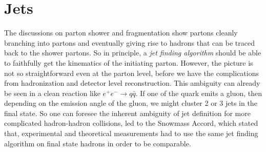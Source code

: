 
\section{Jets}
The discussions on parton shower and fragmentation show partons cleanly branching into partons and eventually giving rise to hadrons that can be traced back to the shower partons. So in principle, a \emph{jet finding algorithm} should be able to faithfully get the kinematics of the initiating parton. However, the picture is not so straightforward even at the parton level, before we have the complications from hadronization and detector level reconstruction. This ambiguity can already be seen in a clean reaction like \(e^+e^-\to q\bar{q}\). If one of the quark emits a gluon, then depending on the emission angle of the gluon, we might cluster 2 or 3 jets in the final state. So one can foresee the inherent ambiguity of jet definition for more complicated hadron-hadron collisions, led to the Snowmass Accord, which stated that, experimental and theoretical measurements had to use the same jet finding algorithm  on final state hadrons in order to be comparable. 

